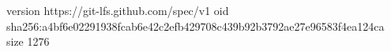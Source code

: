version https://git-lfs.github.com/spec/v1
oid sha256:a4bf6e02291938fcab6e42c2efb429708c439b92b3792ae27e96583f4ea124ca
size 1276

